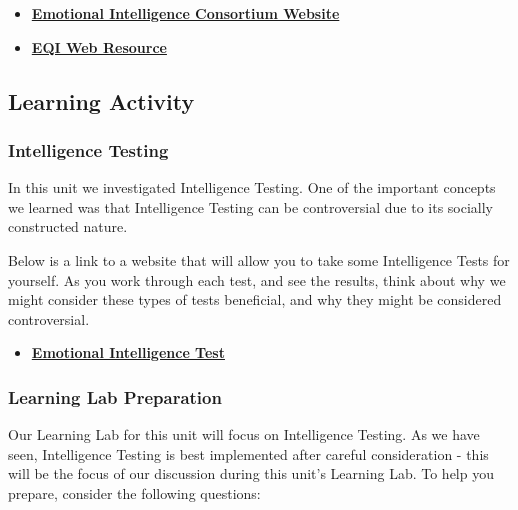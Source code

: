 \documentclass[
]{book}
\providecommand{\tightlist}{%
  \setlength{\itemsep}{0pt}\setlength{\parskip}{0pt}}
\begin{document}
\begin{itemize}
\item
  \href{http://www.eiconsortium.org/}{\textbf{Emotional Intelligence Consortium Website}}
\item
  \href{http://eqi.org/}{\textbf{EQI Web Resource}}
\end{itemize}

\hypertarget{learning-activity-2}{%
\subsection*{Learning Activity}\label{learning-activity-2}}

\begin{reflect}
\hypertarget{intelligence-testing-1}{%
\subsubsection*{Intelligence Testing}\label{intelligence-testing-1}}

In this unit we investigated Intelligence Testing. One of the important concepts we learned was that Intelligence Testing can be controversial due to its socially constructed nature.

Below is a link to a website that will allow you to take some Intelligence Tests for yourself. As you work through each test, and see the results, think about why we might consider these types of tests beneficial, and why they might be considered controversial.

\begin{itemize}
\tightlist
\item
  \href{https://www.queendom.com/tests/}{\textbf{Emotional Intelligence Test}}
\end{itemize}

\hypertarget{learning-lab-preparation-4}{%
\subsubsection*{Learning Lab Preparation}\label{learning-lab-preparation-4}}

Our Learning Lab for this unit will focus on Intelligence Testing. As we have seen, Intelligence Testing is best implemented after careful consideration - this will be the focus of our discussion during this unit's Learning Lab. To help you prepare, consider the following questions:


\end{reflect}
\end{document}
